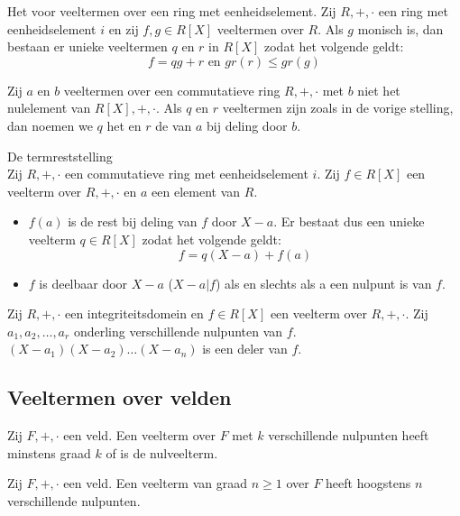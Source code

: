 \documentclass[main.tex]{subfiles}
\begin{document}
\begin{st}
  Het  voor veeltermen over een ring met eenheidselement.
  Zij $R,+,\cdot$ een ring met eenheidselement $i$ en zij $f,g\in R[X]$ veeltermen over $R$.
  Als $g$ monisch is, dan bestaan er unieke veeltermen $q$ en $r$ in $R[X]$ zodat het volgende geldt:
  \[ f = qg + r \text{ en } gr(r) \le gr(g) \]
\end{st}

\begin{de}
  Zij $a$ en $b$ veeltermen over een commutatieve ring $R,+,\cdot$ met $b$ niet het nulelement van $R[X],+,\cdot$.
  Als $q$ en $r$ veeltermen zijn zoals in de vorige stelling, dan noemen we $q$ het  en $r$ de  van $a$ bij deling door $b$.
\end{de}

\begin{st}
  De term{reststelling}\\
  Zij $R,+,\cdot$ een commutatieve ring met eenheidselement $i$.
  Zij $f\in R[X]$ een veelterm over $R,+,\cdot$ en $a$ een element van $R$.
  \begin{itemize}
  \item  $f(a)$ is de rest bij deling van $f$ door $X-a$. Er bestaat dus een unieke veelterm $q\in R[X]$ zodat het volgende geldt:
    \[ f = q(X-a) + f(a) \]
  \item $f$ is deelbaar door $X-a$ ($X-a|f$) als en slechts als a een nulpunt is van $f$.
  \end{itemize}
\end{st}

\begin{st}
  Zij $R,+,\cdot$ een integriteitsdomein en $f\in R[X]$ een veelterm over $R,+,\cdot$.
  Zij $a_{1},a_{2},\dotsc,a_{r}$ onderling verschillende nulpunten van $f$.
  $(X-a_{1})(X-a_{2}) \dotsc (X-a_{n})$ is een deler van $f$.
\end{st}

\subsection{Veeltermen over velden}
\label{sec:veelt-over-veld}

\begin{st}
  Zij $F,+,\cdot$ een veld.
  Een veelterm over $F$ met $k$ verschillende nulpunten heeft minstens graad $k$ of is de nulveelterm.
\end{st}
\begin{st}
  Zij $F,+,\cdot$ een veld.
  Een veelterm van graad $n \ge 1$ over $F$ heeft hoogstens $n$ verschillende nulpunten.
\end{st}
\end{document}
